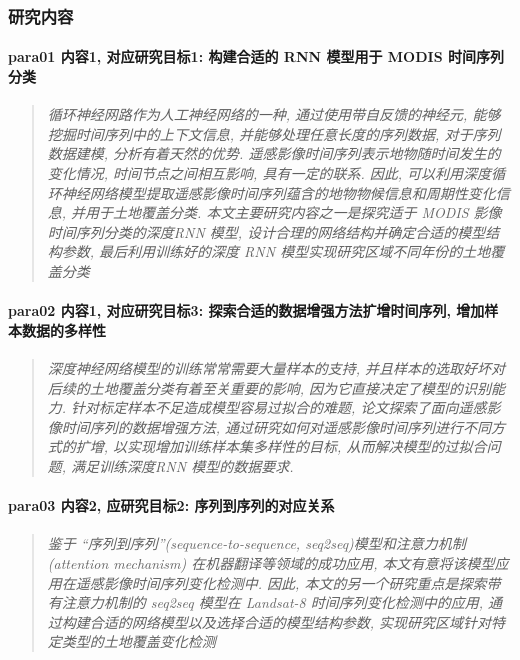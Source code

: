 \subsubsection{研究内容}

\paragraph*{para01
    \textcolor[RGB]{17, 205, 29}{内容1, 对应研究目标1: 构建合适的 RNN 模型用于 MODIS 时间序列分类}}
\begin{quotation}
    \itshape
    循环神经网路作为人工神经网络的一种, 通过使用带自反馈的神经元, 能够挖掘时间序列中的上下文信息, 并能够处理任意长度的序列数据, 对于序列数据建模, 分析有着天然的优势. 遥感影像时间序列表示地物随时间发生的变化情况, 时间节点之间相互影响, 具有一定的联系. 因此, 可以利用深度循环神经网络模型提取遥感影像时间序列蕴含的地物物候信息和周期性变化信息, 并用于土地覆盖分类. 本文主要研究内容之一是探究适于 MODIS 影像时间序列分类的深度RNN 模型, 设计合理的网络结构并确定合适的模型结构参数, 最后利用训练好的深度 RNN 模型实现研究区域不同年份的土地覆盖分类
\end{quotation}

\paragraph*{para02
    \textcolor[RGB]{17, 205, 29}{内容1, 对应研究目标3: 探索合适的数据增强方法扩增时间序列, 增加样本数据的多样性}}
\begin{quotation}
    \itshape
    深度神经网络模型的训练常常需要大量样本的支持, 并且样本的选取好坏对后续的土地覆盖分类有着至关重要的影响, 因为它直接决定了模型的识别能力. 针对标定样本不足造成模型容易过拟合的难题, 论文探索了面向遥感影像时间序列的数据增强方法, 通过研究如何对遥感影像时间序列进行不同方式的扩增, 以实现增加训练样本集多样性的目标, 从而解决模型的过拟合问题, 满足训练深度RNN 模型的数据要求.
\end{quotation}

\paragraph*{para03
    \textcolor[RGB]{17, 205, 29}{内容2, 应研究目标2: 序列到序列的对应关系}}
\begin{quotation}
    \itshape
    鉴于 ``序列到序列''(sequence-to-sequence, seq2seq)模型和注意力机制 (attention  mechanism) 在机器翻译等领域的成功应用, 本文有意将该模型应用在遥感影像时间序列变化检测中. 因此, 本文的另一个研究重点是探索带有注意力机制的 seq2seq 模型在 Landsat-8 时间序列变化检测中的应用, 通过构建合适的网络模型以及选择合适的模型结构参数, 实现研究区域针对特定类型的土地覆盖变化检测
\end{quotation}
